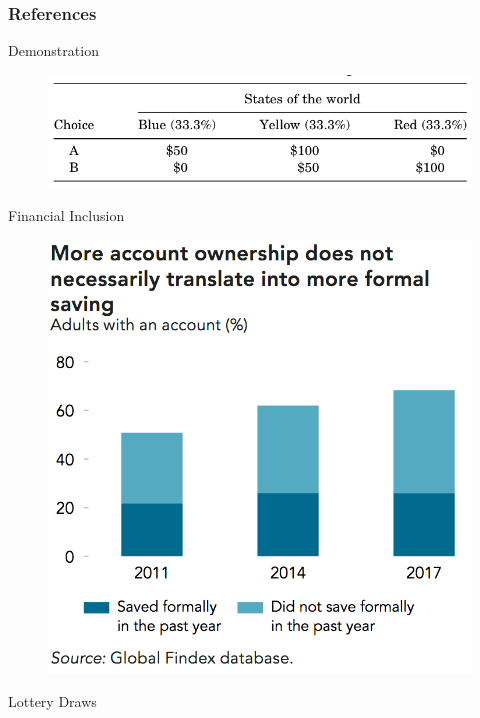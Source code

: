 \documentclass[aspectratio=169]{beamer}
\begin{document}
\begin{frame}[allowframebreaks] \frametitle{References}

	\printbibliography

\end{frame}

\appendix

\begin{frame}{Demonstration}

	\begin{figure}[H]
		\centering
		\includegraphics[width=0.8\linewidth]{fig-lottery.png}
	\end{figure}

\end{frame}

\begin{frame}{Financial Inclusion}

	\begin{figure}[H]
		\centering
		\includegraphics[width=0.45\linewidth]{fig-findex.png}
	\end{figure}

\end{frame}

\begin{frame}{Lottery Draws}

	

\end{frame}
\end{document}
